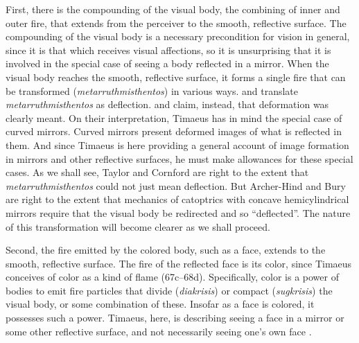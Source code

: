 First, there is the compounding of the visual body, the combining of inner and outer fire, that extends from the perceiver to the smooth, reflective surface. The compounding of the visual body is a necessary precondition for vision in general, since it is that which receives visual affections, so it is unsurprising that it is involved in the special case of seeing a body reflected in a mirror. When the visual body reaches the smooth, reflective surface, it forms a single fire that can be transformed (\emph{metarruthmisthentos}) in various ways. \citet[159]{Archer-Hind:1888qd} and \citet[103]{Bury:1929jb} translate \emph{metarruthmisthentos} as deflection. \citet[287]{Taylor:1928qb} and \citet[154]{Cornford:1935fk} claim, instead, that deformation was clearly meant. On their interpretation, Timaeus has in mind the special case of curved mirrors. Curved mirrors present deformed images of what is reflected in them. And since Timaeus is here providing a general account of image formation in mirrors and other reflective surfaces, he must make allowances for these special cases. As we shall see, Taylor and Cornford are right to the extent that \emph{metarruthmisthentos} could not just mean deflection. But Archer-Hind and Bury are right to the extent that mechanics of catoptrics with concave hemicylindrical mirrors require that the visual body be redirected and so ``deflected''. The nature of this transformation will become clearer as we shall proceed.

Second, the fire emitted by the colored body, such as a face, extends to the smooth, reflective surface. The fire of the reflected face is its color, since Timaeus conceives of color as a kind of flame (67c–68d). Specifically, color is a power of bodies to emit fire particles that divide (\emph{diakrisis}) or compact (\emph{sugkrisis}) the visual body, or some combination of these. Insofar as a face is colored, it possesses such a power. Timaeus, here, is describing seeing a face in a mirror or some other reflective surface, and not necessarily seeing one's own face \citep[286--7]{Taylor:1928qb}. 

